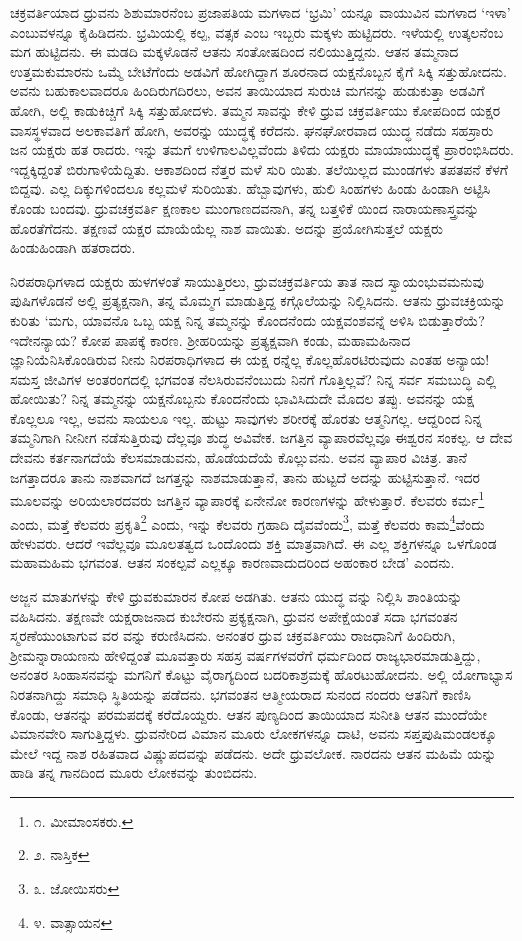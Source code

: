 ಚಕ್ರವರ್ತಿಯಾದ ಧ್ರುವನು ಶಿಶುಮಾರನೆಂಬ ಪ್ರಜಾಪತಿಯ ಮಗಳಾದ ‘ಭ್ರಮಿ’ ಯನ್ನೂ ವಾಯುವಿನ ಮಗಳಾದ ‘ಇಳಾ’ ಎಂಬುವಳನ್ನೂ ಕೈಹಿಡಿದನು. ಭ್ರಮಿಯಲ್ಲಿ ಕಲ್ಪ, ವತ್ಸಕ ಎಂಬ ಇಬ್ಬರು ಮಕ್ಕಳು ಹುಟ್ಟಿದರು. ಇಳೆಯಲ್ಲಿ ಉತ್ಕಲನೆಂಬ ಮಗ ಹುಟ್ಟಿದನು. ಈ ಮಡದಿ ಮಕ್ಕಳೊಡನೆ ಆತನು ಸಂತೋಷದಿಂದ ನಲಿಯುತ್ತಿದ್ದನು. ಆತನ ತಮ್ಮನಾದ ಉತ್ತಮಕುಮಾರನು ಒಮ್ಮೆ ಬೇಟೆಗೆಂದು ಅಡವಿಗೆ ಹೋಗಿದ್ದಾಗ ಶೂರನಾದ ಯಕ್ಷನೊಬ್ಬನ ಕೈಗೆ ಸಿಕ್ಕಿ ಸತ್ತುಹೋದನು. ಅವನು ಬಹುಕಾಲವಾದರೂ ಹಿಂದಿರುಗದಿರಲು, ಅವನ ತಾಯಿಯಾದ ಸುರುಚಿ ಮಗನನ್ನು ಹುಡುಕುತ್ತಾ ಅಡವಿಗೆ ಹೋಗಿ, ಅಲ್ಲಿ ಕಾಡುಕಿಚ್ಚಿಗೆ ಸಿಕ್ಕಿ ಸತ್ತುಹೋದಳು. ತಮ್ಮನ ಸಾವನ್ನು ಕೇಳಿ ಧ್ರುವ ಚಕ್ರವರ್ತಿಯು ಕೋಪದಿಂದ ಯಕ್ಷರ ವಾಸಸ್ಥಳವಾದ ಅಲಕಾವತಿಗೆ ಹೋಗಿ, ಅವರನ್ನು ಯುದ್ಧಕ್ಕೆ ಕರೆದನು. ಘನಘೋರವಾದ ಯುದ್ಧ ನಡೆದು ಸಹಸ್ರಾರು ಜನ ಯಕ್ಷರು ಹತ ರಾದರು. ಇನ್ನು ತಮಗೆ ಉಳಿಗಾಲವಿಲ್ಲವೆಂದು ತಿಳಿದು ಯಕ್ಷರು ಮಾಯಾಯುದ್ಧಕ್ಕೆ ಪ್ರಾರಂಭಿಸಿದರು. ಇದ್ದಕ್ಕಿದ್ದಂತೆ ಬಿರುಗಾಳಿಯೆದ್ದಿತು. ಆಕಾಶದಿಂದ ನೆತ್ತರ ಮಳೆ ಸುರಿ ಯಿತು. ತಲೆಯಿಲ್ಲದ ಮುಂಡಗಳು ತಪತಪನೆ ಕೆಳಗೆ ಬಿದ್ದವು. ಎಲ್ಲ ದಿಕ್ಕುಗಳಿಂದಲೂ ಕಲ್ಲಮಳೆ ಸುರಿಯಿತು. ಹೆಬ್ಬಾವುಗಳು, ಹುಲಿ ಸಿಂಹಗಳು ಹಿಂಡು ಹಿಂಡಾಗಿ ಅಟ್ಟಿಸಿ ಕೊಂಡು ಬಂದವು. ಧ್ರುವಚಕ್ರವರ್ತಿ ಕ್ಷಣಕಾಲ ಮುಂಗಾಣದವನಾಗಿ, ತನ್ನ ಬತ್ತಳಿಕೆ ಯಿಂದ ನಾರಾಯಣಾಸ್ತ್ರವನ್ನು ಹೊರತೆಗೆದನು. ತಕ್ಷಣವೆ ಯಕ್ಷರ ಮಾಯೆಯೆಲ್ಲ ನಾಶ ವಾಯಿತು. ಅದನ್ನು ಪ್ರಯೋಗಿಸುತ್ತಲೆ ಯಕ್ಷರು ಹಿಂಡುಹಿಂಡಾಗಿ ಹತರಾದರು.

ನಿರಪರಾಧಿಗಳಾದ ಯಕ್ಷರು ಹುಳಗಳಂತೆ ಸಾಯುತ್ತಿರಲು, ಧ್ರುವಚಕ್ರವರ್ತಿಯ ತಾತ ನಾದ ಸ್ವಾಯಂಭುವಮನುವು ಪುಷಿಗಳೊಡನೆ ಅಲ್ಲಿ ಪ್ರತ್ಯಕ್ಷನಾಗಿ, ತನ್ನ ಮೊಮ್ಮಗ ಮಾಡುತ್ತಿದ್ದ ಕಗ್ಗೊಲೆಯನ್ನು ನಿಲ್ಲಿಸಿದನು. ಆತನು ಧ್ರುವಚಕ್ರಿಯನ್ನು ಕುರಿತು ‘ಮಗು, ಯಾವನೊ ಒಬ್ಬ ಯಕ್ಷ ನಿನ್ನ ತಮ್ಮನನ್ನು ಕೊಂದನೆಂದು ಯಕ್ಷವಂಶವನ್ನೆ ಅಳಿಸಿ ಬಿಡುತ್ತಾರೆಯೆ? ಇದೇನನ್ಯಾಯ? ಕೋಪ ಪಾಪಕ್ಕೆ ಕಾರಣ. ಶ್ರೀಹರಿಯನ್ನು ಪ್ರತ್ಯಕ್ಷವಾಗಿ ಕಂಡು, ಮಹಾಮಹಿನಾದ ಜ್ಞಾನಿಯೆನಿಸಿಕೊಂಡಿರುವ ನೀನು ನಿರಪರಾಧಿಗಳಾದ ಈ ಯಕ್ಷ ರನ್ನೆಲ್ಲ ಕೊಲ್ಲಹೊರಟಿರುವುದು ಎಂತಹ ಅನ್ಯಾಯ! ಸಮಸ್ತ ಜೀವಿಗಳ ಅಂತರಂಗದಲ್ಲಿ ಭಗವಂತ ನೆಲಸಿರುವನೆಂಬುದು ನಿನಗೆ ಗೊತ್ತಿಲ್ಲವೆ? ನಿನ್ನ ಸರ್ವ ಸಮಬುದ್ಧಿ ಎಲ್ಲಿ ಹೋಯಿತು? ನಿನ್ನ ತಮ್ಮನನ್ನು ಯಕ್ಷನೊಬ್ಬನು ಕೊಂದನೆಂದು ಭಾವಿಸಿದುದೇ ಮೊದಲ ತಪ್ಪು. ಅವನನ್ನು ಯಕ್ಷ ಕೊಲ್ಲಲೂ ಇಲ್ಲ, ಅವನು ಸಾಯಲೂ ಇಲ್ಲ. ಹುಟ್ಟು ಸಾವುಗಳು ಶರೀರಕ್ಕೆ ಹೊರತು ಆತ್ಮನಿಗಲ್ಲ. ಆದ್ದರಿಂದ ನಿನ್ನ ತಮ್ಮನಿಗಾಗಿ ನೀನೀಗ ನಡೆಸುತ್ತಿರುವು ದೆಲ್ಲವೂ ಶುದ್ಧ ಅವಿವೇಕ. ಜಗತ್ತಿನ ವ್ಯಾಪಾರವೆಲ್ಲವೂ ಈಶ್ವರನ ಸಂಕಲ್ಪ. ಆ ದೇವ ದೇವನು ಕರ್ತನಾಗದೆಯೆ ಕೆಲಸಮಾಡುವನು, ಹೊಡೆಯದೆಯೆ ಕೊಲ್ಲುವನು. ಅವನ ವ್ಯಾಪಾರ ವಿಚಿತ್ರ. ತಾನೆ ಜಗತ್ತಾದರೂ ತಾನು ನಾಶವಾಗದೆ ಜಗತ್ತನ್ನು ನಾಶಮಾಡುತ್ತಾನೆ, ತಾನು ಹುಟ್ಟದೆ ಅದನ್ನು ಹುಟ್ಟಿಸುತ್ತಾನೆ. ಇದರ ಮೂಲವನ್ನು ಅರಿಯಲಾರದವರು ಜಗತ್ತಿನ ವ್ಯಾಪಾರಕ್ಕೆ ಏನೇನೋ ಕಾರಣಗಳನ್ನು ಹೇಳುತ್ತಾರೆ. ಕೆಲವರು ಕರ್ಮ\footnote{೧. ಮೀಮಾಂಸಕರು.} ಎಂದು, ಮತ್ತೆ ಕೆಲವರು ಪ್ರಕೃತಿ\footnote{೨. ನಾಸ್ತಿಕ} ಎಂದು, ಇನ್ನು ಕೆಲವರು ಗ್ರಹಾದಿ ದೈವವೆಂದು\footnote{೩. ಜೋಯಿಸರು}, ಮತ್ತೆ ಕೆಲವರು ಕಾಮ\footnote{೪. ವಾತ್ಸಾಯನ}ವೆಂದು ಹೇಳುವರು. ಆದರೆ ಇವೆಲ್ಲವೂ ಮೂಲತತ್ವದ ಒಂದೊಂದು ಶಕ್ತಿ ಮಾತ್ರವಾಗಿದೆ. ಈ ಎಲ್ಲ ಶಕ್ತಿಗಳನ್ನೂ ಒಳಗೊಂಡ ಮಹಾಮಹಿಮ ಭಗವಂತ. ಆತನ ಸಂಕಲ್ಪವೆ ಎಲ್ಲಕ್ಕೂ ಕಾರಣವಾದುದರಿಂದ ಅಹಂಕಾರ ಬೇಡ’ ಎಂದನು. 

ಅಜ್ಜನ ಮಾತುಗಳನ್ನು ಕೇಳಿ ಧ್ರುವಕುಮಾರನ ಕೋಪ ಅಡಗಿತು. ಆತನು ಯುದ್ಧ ವನ್ನು ನಿಲ್ಲಿಸಿ ಶಾಂತಿಯನ್ನು ವಹಿಸಿದನು. ತಕ್ಷಣವೇ ಯಕ್ಷರಾಜನಾದ ಕುಬೇರನು ಪ್ರಕ್ಯಕ್ಷನಾಗಿ, ಧ್ರುವನ ಅಪೇಕ್ಷೆಯಂತೆ ಸದಾ ಭಗವಂತನ ಸ್ಮರಣೆಯುಂಟಾಗುವ ವರ ವನ್ನು ಕರುಣಿಸಿದನು. ಅನಂತರ ಧ್ರುವ ಚಕ್ರವರ್ತಿಯು ರಾಜಧಾನಿಗೆ ಹಿಂದಿರುಗಿ, ಶ್ರೀಮನ್ನಾರಾಯಣನು ಹೇಳಿದ್ದಂತೆ ಮೂವತ್ತಾರು ಸಹಸ್ರ ವರ್ಷಗಳವರೆಗೆ ಧರ್ಮದಿಂದ ರಾಜ್ಯಭಾರಮಾಡುತ್ತಿದ್ದು, ಅನಂತರ ಸಿಂಹಾಸನವನ್ನು ಮಗನಿಗೆ ಕೊಟ್ಟು ವೈರಾಗ್ಯದಿಂದ ಬದರಿಕಾಶ್ರಮಕ್ಕೆ ಹೊರಟುಹೋದನು. ಅಲ್ಲಿ ಯೋಗಾಭ್ಯಾಸ ನಿರತನಾಗಿದ್ದು ಸಮಾಧಿ ಸ್ಥಿತಿಯನ್ನು ಪಡೆದನು. ಭಗವಂತನ ಆತ್ಮೀಯರಾದ ಸುನಂದ ನಂದರು ಆತನಿಗೆ ಕಾಣಿಸಿ ಕೊಂಡು, ಆತನನ್ನು ಪರಮಪದಕ್ಕೆ ಕರೆದೊಯ್ದರು. ಆತನ ಪುಣ್ಯದಿಂದ ತಾಯಿಯಾದ ಸುನೀತಿ ಆತನ ಮುಂದೆಯೇ ವಿಮಾನವೇರಿ ಸಾಗುತ್ತಿದ್ದಳು. ಧ್ರುವನೇರಿದ ವಿಮಾನ ಮೂರು ಲೋಕಗಳನ್ನೂ ದಾಟಿ, ಅವನು ಸಪ್ತಪುಷಿಮಂಡಲಕ್ಕೂ ಮೇಲೆ ಇದ್ದ ನಾಶ ರಹಿತವಾದ ವಿಷ್ಣುಪದವನ್ನು ಪಡೆದನು. ಅದೇ ಧ್ರುವಲೋಕ. ನಾರದನು ಆತನ ಮಹಿಮೆ ಯನ್ನು ಹಾಡಿ ತನ್ನ ಗಾನದಿಂದ ಮೂರು ಲೋಕವನ್ನು ತುಂಬಿದನು.

